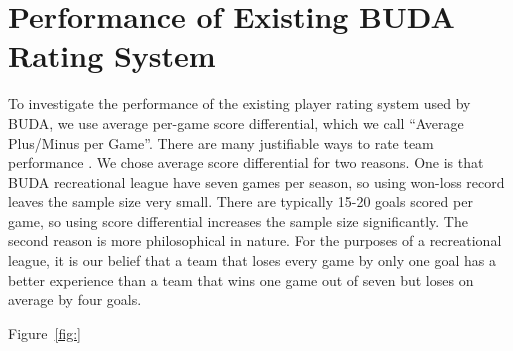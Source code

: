 \section{Performance of Existing BUDA Rating System}\label{sec:existing_performance}

To investigate the performance of the existing player rating system used by BUDA, we use average per-game score differential, which we call ``Average Plus/Minus per Game''. There are many justifiable ways to rate team performance \cite{Langville_2012}.  We chose average score differential for two reasons.  One is that BUDA recreational league have seven games per season, so using won-loss record leaves the sample size very small.  There are typically 15-20 goals scored per game, so using score differential increases the sample size significantly.  The second reason is more philosophical in nature.  For the purposes of a recreational league, it is our belief that a team that loses every game by only one goal has a better experience than a team that wins one game out of seven but loses on average by four goals.  

Figure~\ref{fig:}